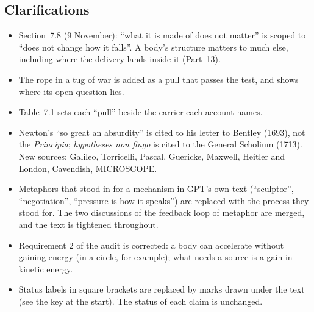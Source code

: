 \documentclass[11pt,a4paper]{article}
\begin{document}
\subsection*{Clarifications}
\begin{itemize}
\item Section~7.8 (9 November): ``what it is made of does not matter'' is scoped to ``does not change how it falls''. A body's structure matters to much else, including where the delivery lands inside it (Part~13).
  \item The rope in a tug of war is added as a pull that passes the test, and shows where its open question lies.
  \item Table~7.1 sets each ``pull'' beside the carrier each account names.
  \item Newton's ``so great an absurdity'' is cited to his letter to Bentley (1693), not the \emph{Principia}; \emph{hypotheses non fingo} is cited to the General Scholium (1713). New sources: Galileo, Torricelli, Pascal, Guericke, Maxwell, Heitler and London, Cavendish, MICROSCOPE.
  \item Metaphors that stood in for a mechanism in GPT's own text (``sculptor'', ``negotiation'', ``pressure is how it speaks'') are replaced with the process they stood for. The two discussions of the feedback loop of metaphor are merged, and the text is tightened throughout.
  \item Requirement 2 of the audit is corrected: a body can accelerate without gaining energy (in a circle, for example); what needs a source is a gain in kinetic energy.
  \item Status labels in square brackets are replaced by marks drawn under the text (see the key at the start). The status of each claim is unchanged.
\end{itemize}

\newpage


\end{document}
